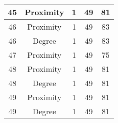 \documentclass[results.tex]{subfiles}
\begin{document}
\begin{center}
\begin{tabular}{| c || c | c | c | c |}
    \hline
    45 & Proximity & 1 & 49 & 81 \\ 
    \hline
    46 & Proximity & 1 & 49 & 83 \\ 
    \hline
    46 & Degree & 1 & 49 & 83 \\ 
    \hline
    47 & Proximity & 1 & 49 & 75 \\ 
    \hline
    48 & Proximity & 1 & 49 & 81 \\ 
    \hline
    48 & Degree & 1 & 49 & 81 \\ 
    \hline
    49 & Proximity & 1 & 49 & 81 \\ 
    \hline
    49 & Degree & 1 & 49 & 81 \\ 
    \hline   \end{tabular}
\end{center}
\end{document}
